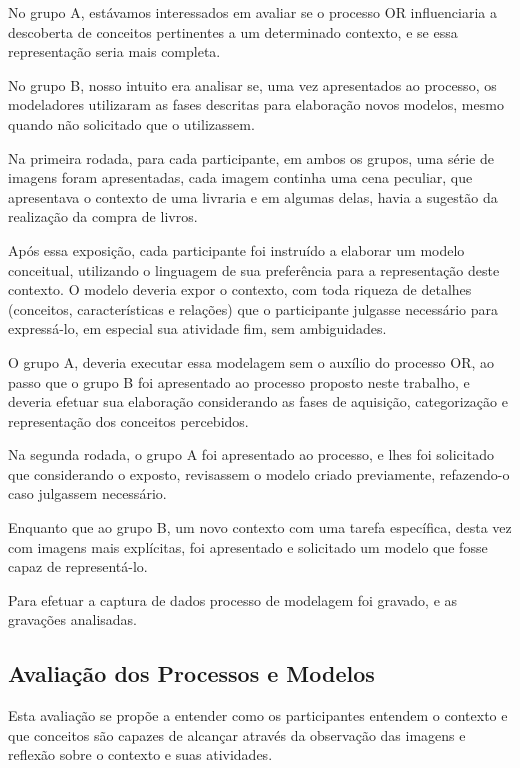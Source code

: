 No grupo A, estávamos interessados em avaliar se o processo OR influenciaria a descoberta de conceitos pertinentes a um determinado contexto, e se essa representação seria mais completa.

No grupo B, nosso intuito era analisar se, uma vez apresentados ao processo, os modeladores utilizaram as fases descritas para elaboração novos modelos, mesmo quando não solicitado que o utilizassem.

Na primeira rodada, para cada participante, em ambos os grupos, uma série de imagens foram apresentadas, cada imagem continha uma cena peculiar, que apresentava o contexto de uma livraria e em algumas delas, havia a sugestão da realização da compra de livros.

Após essa exposição, cada participante foi instruído a elaborar um modelo conceitual, utilizando o linguagem de sua preferência para a representação deste contexto. O modelo deveria expor o contexto, com toda riqueza de detalhes (conceitos, características e relações) que o participante julgasse necessário para expressá-lo, em especial sua atividade fim, sem ambiguidades. 

O grupo A, deveria executar essa modelagem sem o auxílio do processo OR, ao passo que o grupo B foi apresentado ao processo proposto neste trabalho, e deveria efetuar sua elaboração considerando as fases de aquisição, categorização e representação dos conceitos percebidos.

Na segunda rodada, o grupo A foi apresentado ao processo, e lhes foi solicitado que considerando o exposto, revisassem o modelo criado previamente, refazendo-o caso julgassem necessário.

Enquanto que ao grupo B, um novo contexto com uma tarefa específica, desta vez com imagens mais explícitas, foi apresentado e solicitado um modelo que fosse capaz de representá-lo.

Para efetuar a captura de dados processo de modelagem foi gravado, e as gravações analisadas.

\subsection{\hspace*{3pt} Avaliação dos Processos e Modelos}

Esta avaliação se propõe a entender como os participantes entendem o contexto e que conceitos são capazes de alcançar através da observação das imagens e reflexão sobre o contexto e suas atividades. 

